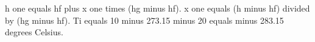h one equals hf plus x one times (hg minus hf).  
x one equals (h minus hf) divided by (hg minus hf).  
Ti equals 10 minus 273.15 minus 20 equals minus 283.15 degrees Celsius.